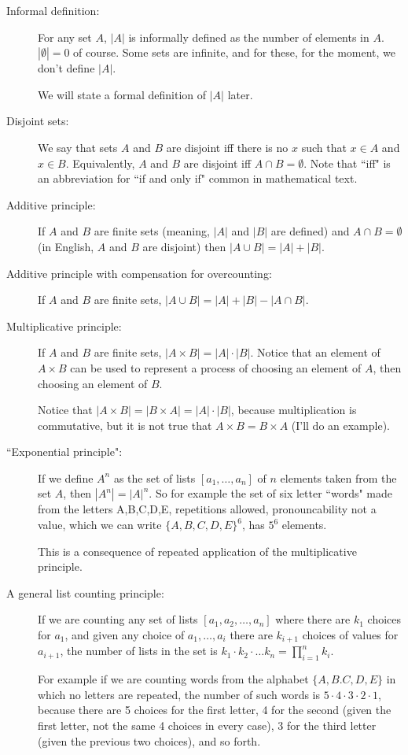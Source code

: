 \documentclass[12pt]{article}
\begin{document}
\begin{description}

\item[Informal definition:]  For any set $A$, $|A|$ is informally defined as the number of elements in $A$.
$|\emptyset|=0$ of course.  Some sets are infinite, and for these, for the moment, we don't define $|A|$.

We will state a formal definition of $|A|$ later.

\item[Disjoint sets:]  We say that sets $A$ and $B$ are disjoint iff there is no $x$ such that $x \in A$ and $x \in B$.
Equivalently, $A$ and $B$ are disjoint iff $A \cap B = \emptyset$.  Note that ``iff" is an abbreviation for ``if and only if" common in mathematical text.

\item[Additive principle:]   If $A$ and $B$ are finite sets (meaning, $|A|$ and $|B|$ are defined) and $A \cap B = \emptyset$ (in English, $A$ and $B$ are disjoint) then $|A \cup B| = |A| + |B|$.

\item[Additive principle with compensation for overcounting:]  If $A$ and $B$ are finite sets,
$|A \cup B| = |A| + |B| - |A\cap B|$.

\item[Multiplicative principle:]  If $A$ and $B$ are finite sets, $|A \times B| = |A|\cdot |B|$.  Notice that
an element of $A \times B$ can be used to represent a process of choosing an element of $A$, then choosing an element of $B$.

Notice that $|A \times B| = |B \times A| = |A|\cdot |B|$, because multiplication is commutative, but it is not true
that $A \times B = B \times A$ (I'll do an example).

\item[``Exponential principle":]  If we define $A^n$ as the set of lists $[a_1,\ldots,a_n]$ of $n$ elements taken from the set $A$, then $|A^n| = |A|^n$.  So for example the set of six letter ``words" made from the letters A,B,C,D,E, repetitions allowed, pronouncability not a value, which we can write $\{A,B,C,D,E\}^6$, has $5^6$ elements.

This is a consequence of repeated application of the multiplicative principle.

\item[A general list counting principle:]  If we are counting any set of lists $[a_1,a_2,\ldots,a_n]$ where there are $k_1$ choices for $a_1$, and given any choice of $a_1,\ldots,a_i$ there are $k_{i+1}$ choices of values for $a_{i+1}$, the
number of lists in the set is $k_1\cdot k_2 \cdot \ldots k_n= \prod_{i=1}^nk_i$.

For example if we are counting words from the alphabet $\{A,B.C,D,E\}$ in which no letters are repeated,
the number of such words is $5 \cdot 4\cdot 3\cdot 2\cdot 1$, because there are 5 choices for the first letter,
4 for the second (given the first letter, not the same 4 choices in every case), 3 for the third letter (given the previous two choices), and so forth.

\end{description}
\end{document}
